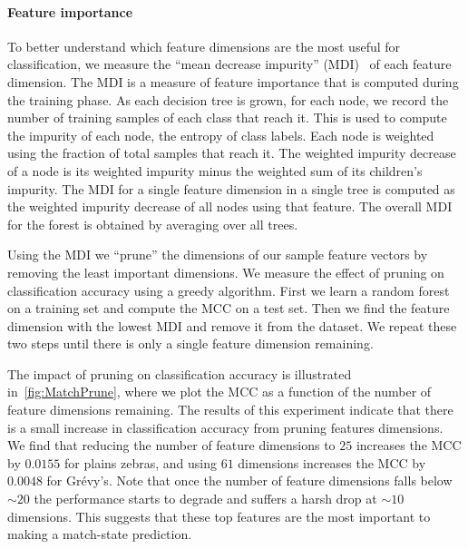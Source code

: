         \PositiveHist{}

        \PositiveROC{}

        \FloatBarrier{}
        \paragraph{Feature importance}

        To better understand which feature dimensions are the most useful for classification, we measure the
          ``mean decrease impurity'' (MDI)~\cite{louppe_understanding_2014} of each feature dimension.
        The MDI is a measure of feature importance that is computed during the training phase.
        As each decision tree is grown, for each node, we record the number of training samples of each class
          that reach it.
        This is used to compute the impurity of each node, \ie{} the entropy of class labels.
        Each node is weighted using the fraction of total samples that reach it.
        The weighted impurity decrease of a node is its weighted impurity minus the weighted sum of its
          children's impurity.
        The MDI for a single feature dimension in a single tree is computed as the weighted impurity decrease of
          all nodes using that feature.
        The overall MDI for the forest is obtained by averaging over all trees.


        Using the MDI we ``prune'' the dimensions of our sample feature vectors by removing the least important
          dimensions.
        We measure the effect of pruning on classification accuracy using a greedy algorithm.
        First we learn a random forest on a training set and compute the MCC on a test set.
        Then we find the feature dimension with the lowest MDI and remove it from the dataset.
        We repeat these two steps until there is only a single feature dimension remaining.

        The impact of pruning on classification accuracy is illustrated in~\cref{fig:MatchPrune}, where we plot
          the MCC as a function of the number of feature dimensions remaining.
        The results of this experiment indicate that there is a small increase in classification accuracy from
          pruning features dimensions.
        We find that reducing the number of feature dimensions to $25$ increases the MCC by $0.0155$ for plains
          zebras, and using $61$ dimensions increases the MCC by $0.0048$ for Grévy's.
        Note that once the number of feature dimensions falls below ${\sim}20$ the performance starts to degrade
          and suffers a harsh drop at ${\sim}10$ dimensions.
        This suggests that these top features are the most important to making a match-state prediction.

